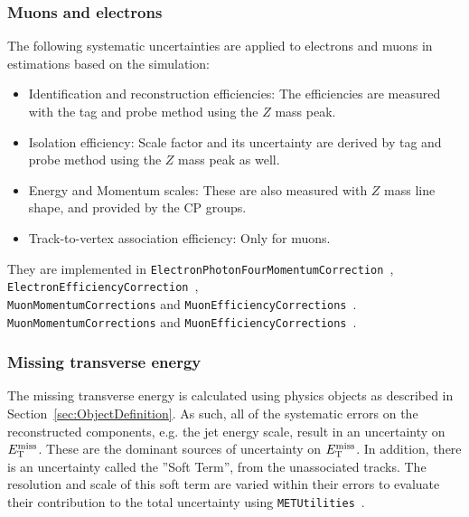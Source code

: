 \subsubsection*{Muons and electrons}
The following systematic uncertainties are applied to electrons and muons in estimations based on the simulation:

\begin{itemize}
\item Identification and reconstruction efficiencies: The efficiencies are measured with the tag and probe method using the $Z$ mass peak.
\item Isolation efficiency: Scale factor and its uncertainty are derived by tag and probe method using the $Z$ mass peak as well.
\item Energy and Momentum scales: These are also measured with $Z$ mass line shape, and provided by the CP groups.
\item Track-to-vertex association efficiency: Only for muons.
\end{itemize}

They are implemented in \texttt{ElectronPhotonFourMomentumCorrection}~\cite{EgammaCalibration},\\
\texttt{ElectronEfficiencyCorrection}~\cite{AsgElectronEfficiencyCorrectionTool}, \\
\texttt{MuonMomentumCorrections} and \texttt{MuonEfficiencyCorrections}~\cite{MCPAnalysisGuidelines}.
\texttt{MuonMomentumCorrections} and \texttt{MuonEfficiencyCorrections}~\cite{MCPAnalysisGuidelines}.


\subsubsection*{Missing transverse energy}
 The missing transverse energy is calculated using physics objects as described in Section~\ref{sec:ObjectDefinition}.
As such, all of the systematic errors on the reconstructed components, e.g. the jet energy scale,
result in an uncertainty on $E_\mathrm{T}^\mathrm{miss}$. These are the dominant sources of uncertainty on $E_\mathrm{T}^\mathrm{miss}$.
In addition, there is an uncertainty called the ''Soft Term'', from the unassociated tracks.
The resolution and scale of this soft term are varied within their errors to evaluate their
contribution to the total uncertainty using \texttt{METUtilities}~\cite{METUtilSystematics}.


